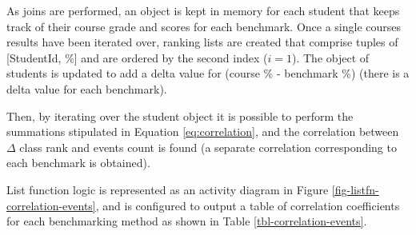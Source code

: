 As joins are performed, an object is kept in memory for each student that keeps track of their course grade and scores for each benchmark. Once a single courses results have been iterated over, ranking lists are created that comprise tuples of [StudentId, \%] and are ordered by the second index ($i = 1$). The object of students is updated to add a delta value for (course \% - benchmark \%) (there is a delta value for each benchmark).

Then, by iterating over the student object it is possible to perform the summations stipulated in Equation \ref{eq:correlation}, and the correlation between $\Delta$ class rank and events count is found (a separate correlation corresponding to each benchmark is obtained).

List function logic is represented as an activity diagram in Figure \ref{fig-listfn-correlation-events}, and is configured to output a table of correlation coefficients for each benchmarking method as shown in Table \ref{tbl-correlation-events}.



